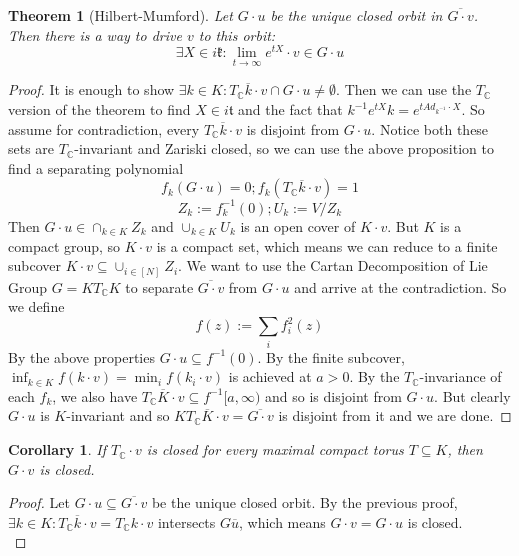 \documentclass{article}
\newtheorem{theorem}{Theorem}
\newtheorem{corollary}{Corollary}
\newcommand{\C}{{\mathbb{C}}}
\begin{document}
\begin{theorem} [Hilbert-Mumford]
Let $G \cdot u$ be the unique closed orbit in $\overline{G \cdot v}$. Then there is a way to drive $v$ to this orbit: 
\[ \exists X \in i \mathfrak{k}: \lim_{t \to \infty} e^{tX} \cdot v \in G \cdot u  \]
\end{theorem}
\begin{proof}
It is enough to show $\exists k \in K: \overline{T_{\C} k \cdot v} \cap G \cdot u \neq \emptyset$. Then we can use the $T_{\C}$ version of the theorem to find $X \in i \mathfrak{t}$ and the fact that $k^{-1} e^{tX} k = e^{t Ad_{k^{-1}} \cdot X}$. So assume for contradiction, every $\overline{T_{\C} k \cdot v}$ is disjoint from $G \cdot u$. Notice both these sets are $T_{\C}$-invariant and Zariski closed, so we can use the above proposition to find a separating polynomial 
\[ f_{k}(G \cdot u) = 0; f_{k}(\overline{T_{\C} k \cdot v}) = 1 \]
\[ Z_{k} := f_{k}^{-1}(0); U_{k} := V/Z_{k} \]
Then $G \cdot u \in \cap_{k \in K} Z_{k}$ and $\cup_{k \in K} U_{k}$ is an open cover of $K \cdot v$. But $K$ is a compact group, so $K \cdot v$ is a compact set, which means we can reduce to a finite subcover $K \cdot v \subseteq \cup_{i \in [N]} Z_{i}$. We want to use the Cartan Decomposition of Lie Group $G = K T_{\C} K$ to separate $\overline{G \cdot v}$ from $G \cdot u$ and arrive at the contradiction. So we define
\[ f(z) := \sum_{i} f_{i}^{2}(z) \]
By the above properties $G \cdot u \subseteq f^{-1}(0)$. By the finite subcover, $\inf_{k \in K} f(k \cdot v) = \min_{i} f(k_{i} \cdot v)$ is achieved at $a > 0$. By the $T_{\C}$-invariance of each $f_{k}$, we also have $\overline{T_{\C} K \cdot v} \subseteq f^{-1}[a, \infty)$ and so is disjoint from $G \cdot u$. But clearly $G \cdot u$ is $K$-invariant and so $K\overline{T_{\C} K \cdot v} = \overline{G \cdot v}$ is disjoint from it and we are done. 
\end{proof}

\begin{corollary}
If $T_{\C} \cdot v$ is closed for every maximal compact torus $T \subseteq K$, then $G \cdot v$ is closed. 
\end{corollary}
\begin{proof}
Let $G \cdot u \subseteq \overline{G \cdot v}$ be the unique closed orbit. By the previous proof, $\exists k \in K: \overline{T_{\C} k \cdot v} = T_{\C} k \cdot v$ intersects $G \overline u$, which means $G \cdot v = G \cdot u$ is closed. 
\\ 
\end{proof}
\end{document}
